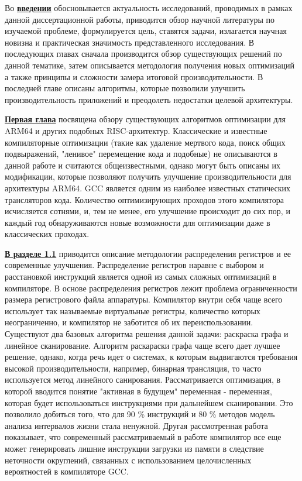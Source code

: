 Во \underline{\textbf{введении}} обосновывается актуальность исследований, проводимых в рамках данной диссертационной работы, приводится обзор научной литературы по изучаемой проблеме, формулируется цель, ставятся задачи, излагается научная новизна и практическая значимость представленного исследования. В последующих главах сначала производится обзор существующих решений по данной тематике, затем описывается методология получения новых оптимизаций а также принципы и сложности замера итоговой производительности. В последней главе описаны алгоритмы, которые позволили улучшить производительность приложений и преодолеть недостатки целевой архитектуры.


\underline{\textbf{Первая глава}} посвящена обзору существующих алгоритмов оптимизации
для ARM64 и других подобных RISC-архитектур. Классические и известные
компиляторные оптимизации (такие как удаление мертвого кода, поиск общих
подвыражений, "ленивое"\phantom{} перемещение кода и подобные) не описываются в данной работе и считаются общеизвестными, однако могут быть описаны их модификации, которые
позволяют получить улучшение производительности для архитектуры ARM64.
GCC является одним из наиболее известных статических трансляторов
кода. Количество оптимизирующих проходов этого компилятора исчисляется
сотнями, и, тем не менее, его улучшение происходит до сих пор, и каждый
год обнаруживаются новые возможности для оптимизации даже в классических
проходах. 




\underline{\textbf{В разделе 1.1}} приводится описание методологии распределения регистров
и ее современные улучшения. Распределение регистров наравне с выбором и расстановкой инструкций
является одной из самых сложных оптимизаций в компиляторе. В  основе распределения регистров лежит проблема ограниченности размера
регистрового файла аппаратуры. Компилятор внутри себя чаще всего
использует так называемые виртуальные регистры, количество которых неограниченно,
и компилятор не заботится об их переиспользовании. Существуют два базовых алгоритма решения данной задачи: раскраска графа и линейное сканирование. Алгоритм раскараски графа чаще всего дает лучшее решение, однако, когда речь идет о системах, к которым выдвигаются требования
высокой производительности, например, бинарная трансляция, то часто используется
метод линейного санирования. Рассматривается  оптимизация, в которой вводится понятие "активная в
будущем"\phantom{} переменная - переменная, которая будет использоваться инструкциями
при дальнейшем сканировании. Это позволило добиться того, что для 90 \%
инструкций и 80 \% методов модель анализа интервалов жизни стала ненужной. Другая рассмотренная работа показывает, что современный рассматриваемый в работе компилятор все еще может генерировать лишние инструкции загрузки из памяти в
следствие неточности округлений, связанных с использованием целочисленных
вероятностей в компиляторе GCC.

